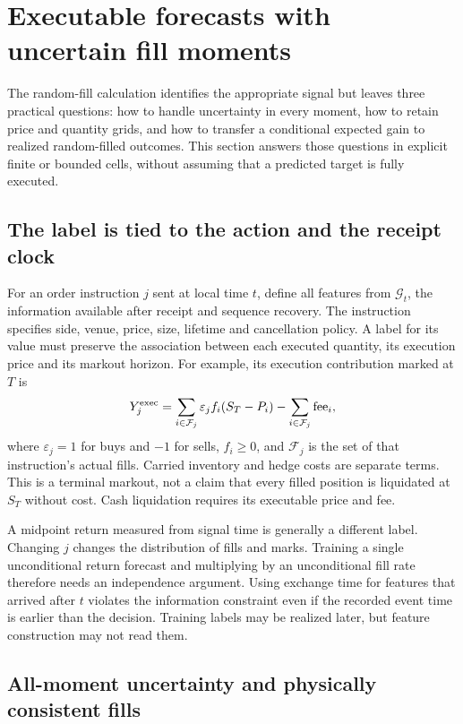 \section{Executable forecasts with uncertain fill moments}
\label{sec:productionforecast}

The random-fill calculation identifies the appropriate signal but leaves
three practical questions: how to handle uncertainty in every moment,
how to retain price and quantity grids, and how to transfer a conditional
expected gain to realized random-filled outcomes. This section answers
those questions in explicit finite or bounded cells, without assuming
that a predicted target is fully executed.

\subsection{The label is tied to the action and the receipt clock}

For an order instruction $j$ sent at local time $t$, define all features
from $\mathcal G_t$, the information available after receipt and sequence
recovery. The instruction specifies side, venue, price, size, lifetime and
cancellation policy. A label for its value must preserve the association
between each executed quantity, its execution price and its markout horizon.
For example, its execution contribution marked at $T$ is
\[
 Y^{\rm exec}_j=\sum_{i\in\mathcal F_j}
 \varepsilon_j f_i(S_T-P_i)-\sum_{i\in\mathcal F_j}\mathrm{fee}_i,
\]
where $\varepsilon_j=1$ for buys and $-1$ for sells, $f_i\ge0$, and
$\mathcal F_j$ is the set of that instruction's actual fills. Carried
inventory and hedge costs are separate terms. This is a terminal markout,
not a claim that every filled position is liquidated at $S_T$ without cost.
Cash liquidation requires its executable price and fee.

A midpoint return measured from signal time is generally a different label.
Changing $j$ changes the distribution of fills and marks. Training a single
unconditional return forecast and multiplying by an unconditional fill rate
therefore needs an independence argument. Using exchange time for features
that arrived after $t$ violates the information constraint even if the
recorded event time is earlier than the decision. Training labels may be
realized later, but feature construction may not read them.

\subsection{All-moment uncertainty and physically consistent fills}

